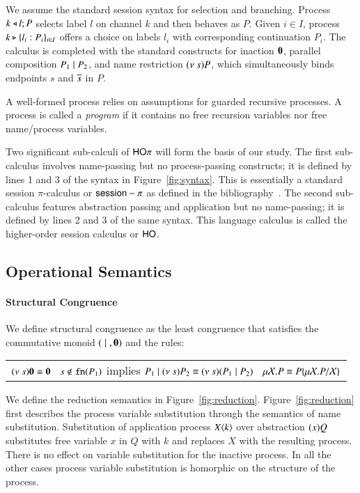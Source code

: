 We assume the standard session syntax for selection and branching. Process
$k \triangleleft l ; P$ selects label $l$ on channel $k$ and then behaves as $P$. 
Given $i \in I$, 
process 
$k \triangleright \{l_i:P_i\}_{i \in I}$ offers a choice on labels $l_i$ with
corresponding continuation $P_i$.
The calculus is completed with the standard constructs for 
inaction $\mathbf{0}$, 
parallel composition $P_1 \;|\; P_2$, and 
name restriction $(\nu\ s) P$, which simultaneously binds endpoints $s$ and $\overline{s}$ in $P$.

A well-formed process relies on assumptions for guarded recursive processes.
A process is called a \emph{program} if it contains 
no free recursion variables nor free name/process variables.



Two significant sub-calculi of $\mathsf{HO}\pi$ will form the basis of our study.
The first sub-calculus involves name-passing but no process-passing constructs; it is 
defined by lines 1 and 3 of the syntax in Figure~\ref{fig:syntax}.
This is essentially a standard session $\pi$-calculus 
or $\mathsf{session}-\pi$ as defined in the bibliography~\cite{}.
The second sub-calculus features abstraction passing and application but no name-passing; 
it is defined by lines 2 and 3 of the same syntax. This language 
calculus is called the higher-order session calculus or $\mathsf{HO}$.


\subsection{Operational Semantics}

\paragraph{Structural Congruence}

We define structural congruence as the least congruence that satisfies the commutative monoid $(\;|\;, \mathbf{0})$
and the rules:

\begin{tabular}{c}
	$(\nu\ s) \mathbf{0} \equiv \mathbf{0} \quad
	s \notin \mathtt{fn}(P_1)$ implies $P_1 \;|\; (\nu\ s) P_2 \equiv (\nu\ s)(P_1 \;|\; P_2)
	\quad \mu \mathcal{X}. P \equiv P\{\mu \mathcal{X}. P/\mathcal{X} \}$
\end{tabular}


We define the reduction semantics in Figure~\ref{fig:reduction}.
Figure~\ref{fig:reduction} first describes the process variable
substitution through the semantics
of name substitution. Substitution of application process $X\langle k \rangle$
over abstraction $(x)Q$ substitutes free variable
$x$ in $Q$ with $k$ and replaces $X$ with the resulting process.
There is no effect on variable substitution for the inactive process.
In all the other cases process variable substitution is homorphic 
on the structure of the process.


